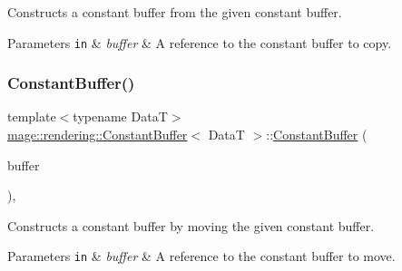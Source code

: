 Constructs a constant buffer from the given constant buffer.


\begin{DoxyParams}[1]{Parameters}
\mbox{\tt in}  & {\em buffer} & A reference to the constant buffer to copy. \\
\hline
\end{DoxyParams}
\hypertarget{classmage_1_1rendering_1_1_constant_buffer_a615874bb60bdde1075ae912d7e5b7a37}{}\label{classmage_1_1rendering_1_1_constant_buffer_a615874bb60bdde1075ae912d7e5b7a37} 
\subsubsection{\texorpdfstring{Constant\+Buffer()}{ConstantBuffer()}\hspace{0.1cm}{\footnotesize\ttfamily [3/3]}}
{\footnotesize\ttfamily template$<$typename DataT$>$ \\
\hyperlink{classmage_1_1rendering_1_1_constant_buffer}{mage\+::rendering\+::\+Constant\+Buffer}$<$ DataT $>$\+::\hyperlink{classmage_1_1rendering_1_1_constant_buffer}{Constant\+Buffer} (\begin{DoxyParamCaption}\item[{\hyperlink{classmage_1_1rendering_1_1_constant_buffer}{Constant\+Buffer}$<$ DataT $>$ \&\&}]{buffer }\end{DoxyParamCaption})\hspace{0.3cm}{\ttfamily [default]}, {\ttfamily [noexcept]}}

Constructs a constant buffer by moving the given constant buffer.


\begin{DoxyParams}[1]{Parameters}
\mbox{\tt in}  & {\em buffer} & A reference to the constant buffer to move. \\
\hline
\end{DoxyParams}
\hypertarget{classmage_1_1rendering_1_1_constant_buffer_a9c8ea67e36a9e80cfaabebdc0de2fae7}{}\label{classmage_1_1rendering_1_1_constant_buffer_a9c8ea67e36a9e80cfaabebdc0de2fae7} 
